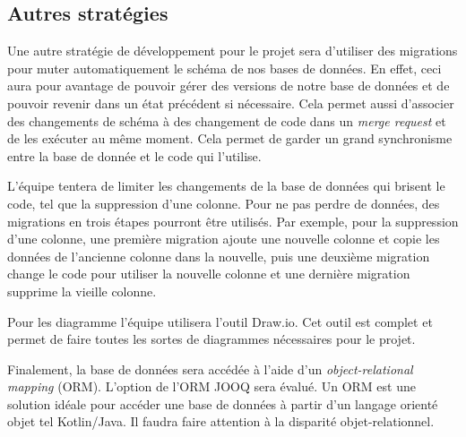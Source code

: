 	\subsection{Autres stratégies}
	Une autre stratégie de développement pour le projet sera d’utiliser des migrations pour muter automatiquement le schéma de nos bases de données. En effet, ceci aura pour avantage de pouvoir gérer des versions de notre base de données et de pouvoir revenir dans un état précédent si nécessaire. Cela permet aussi d’associer des changements de schéma à des changement de code dans un \emph{merge request} et de les exécuter au même moment. Cela permet de garder un grand synchronisme entre la base de donnée et le code qui l’utilise. 

	L’équipe tentera de limiter les changements de la base de données qui brisent le code, tel que la suppression d’une colonne. Pour ne pas perdre de données, des migrations en trois étapes pourront être utilisés. Par exemple, pour la suppression d’une colonne, une première migration ajoute une nouvelle colonne et copie les données de l’ancienne colonne dans la nouvelle, puis une deuxième migration change le code pour utiliser la nouvelle colonne et une dernière migration supprime la vieille colonne. 

	Pour les diagramme l’équipe utilisera l’outil Draw.io. Cet outil est complet et permet de faire toutes les sortes de diagrammes nécessaires pour le projet. 

	Finalement, la base de données sera accédée à l’aide d’un \emph{object-relational mapping} (ORM). L’option de l’ORM JOOQ sera évalué. Un ORM est une solution idéale pour accéder une base de données à partir d’un langage orienté objet tel Kotlin/Java. Il faudra faire attention à la disparité objet-relationnel.

	